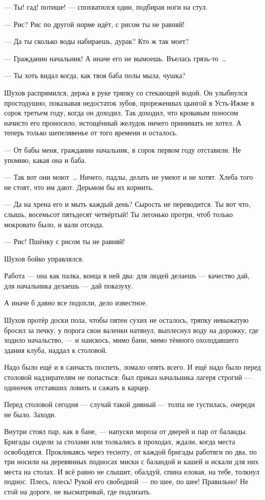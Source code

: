--- Ты! гад! потише! --- спохватился один, подбирая ноги на стул.

--- Рис? Рис по другой норме идёт, с рисом ты не равняй!

--- Да ты сколько воды набираешь, дурак? Кто ж так моет?

--- Гражданин начальник! А иначе его не вымоешь. Въелась грязь-то~\dots{}

--- Ты хоть видал когда, как твоя баба полы мыла, чушка?

Шухов распрямился, держа в руке тряпку со стекающей водой. Он улыбнулся простодушно, 
показывая недостаток зубов, прореженных цынгой в Усть-Ижме в сорок третьем году, когда он 
доходил. Так доходил, что кровавым поносом начисто его проносило, истощённый желудок ничего 
принимать не хотел. А теперь только шепелявенье от того времени и осталось.

--- От бабы меня, гражданин начальник, в сорок первом году отставили. Не упомню, какая она и 
баба.

--- Так вот они моют~\dots{} Ничего, падлы, делать не умеют и не хотят. Хлеба того не стоят, что им 
дают. Дерьмом бы их кормить.

--- Да на хрена его и мыть каждый день? Сырость не переводится. Ты вот что, слышь, восемьсот 
пятьдесят четвёртый! Ты легонько протри, чтоб только мокровато было, и вали отсюда.

--- Рис! Пшёнку с рисом ты не равняй!

Шухов бойко управлялся.

Работа --- она как палка, конца в ней два: для людей делаешь --- качество дай, для начальника 
делаешь --- дай показуху.

А иначе б давно все подохли, дело известное.

Шухов протёр доски пола, чтобы пятен сухих не осталось, тряпку невыжатую бросил за печку, у 
порога свои валенки натянул, выплеснул воду на дорожку, где ходило начальство, --- и наискось, 
мимо бани, мимо тёмного охолодавшего здания клуба, наддал к столовой.

Надо было ещё и в санчасть поспеть, ломало опять всего. И ещё надо было перед столовой 
надзирателям не попасться: был приказ начальника лагеря строгий --- одиночек отставших 
ловить и сажать в карцер.

Перед столовой сегодня --- случай такой дивный --- толпа не густилась, очереди не было. Заходи.

Внутри стоял пар, как в бане, --- напуски мороза от дверей и пар от баланды. Бригады сидели за 
столами или толкались в проходах, ждали, когда места освободятся. Прокликаясь через тесноту, 
от каждой бригады работяги по два, по три носили на деревянных подносах миски с баландой и 
кашей и искали для них места на столах. И всё равно не слышит, обалдуй, спина еловая, на тебе, 
толкнул поднос. Плесь, плесь! Рукой его свободной --- по шее, по шее! Правильно! Не стой на 
дороге, не высматривай, где подлизать.

